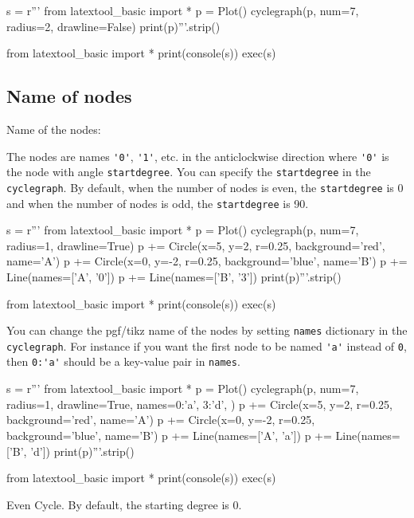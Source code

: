 \begin{python}
s = r'''
from latextool_basic import *
p = Plot()
cyclegraph(p, num=7, radius=2, drawline=False)
print(p)'''.strip()

from latextool_basic import *
print(console(s))
exec(s)
\end{python}




\newpage
\subsection{Name of nodes}

Name of the nodes:

The nodes are names
\verb!'0'!,
\verb!'1'!, etc. in the anticlockwise direction where \verb!'0'!
is the node with angle \verb!startdegree!.
You can specify the \verb!startdegree! in the \verb!cyclegraph!.
By default, when the number of nodes is even, the \verb!startdegree! is 0
and when the number of nodes is odd, the \verb!startdegree! is 90.

\begin{python}
s = r'''
from latextool_basic import *
p = Plot()
cyclegraph(p, num=7, radius=1, drawline=True)
p += Circle(x=5, y=2, r=0.25, background='red', name='A')
p += Circle(x=0, y=-2, r=0.25, background='blue', name='B')
p += Line(names=['A', '0'])
p += Line(names=['B', '3'])
print(p)'''.strip()

from latextool_basic import *
print(console(s))
exec(s)
\end{python}


You can change the pgf/tikz name of the nodes by
setting \verb!names! dictionary in the \verb!cyclegraph!.
For instance if you want the first node to be named \verb!'a'!
instead of \verb!0!, then \verb!0:'a'! should be a key-value pair
in \verb!names!.

\begin{python}
s = r'''
from latextool_basic import *
p = Plot()
cyclegraph(p, num=7, radius=1, drawline=True,
           names={0:'a',
                  3:'d',
                  })
p += Circle(x=5, y=2, r=0.25, background='red', name='A')
p += Circle(x=0, y=-2, r=0.25, background='blue', name='B')
p += Line(names=['A', 'a'])
p += Line(names=['B', 'd'])
print(p)'''.strip()

from latextool_basic import *
print(console(s))
exec(s)
\end{python}


\newpage
Even Cycle.
By default, the starting degree is 0.

